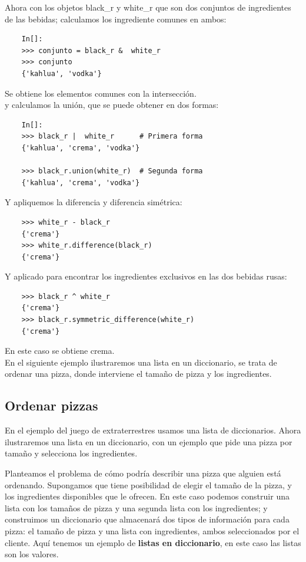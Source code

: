 Ahora con los objetos   {\ttfamily  black\_r}  y  {\ttfamily white\_r} que son dos conjuntos de ingredientes de las bebidas; calculamos los ingrediente comunes en ambos: 

\begin{lstlisting}
	In[]:
	>>> conjunto = black_r &  white_r
	>>> conjunto
	{'kahlua', 'vodka'}
\end{lstlisting}
Se obtiene los elementos comunes con la intersección.\\


y calculamos la unión, que se puede obtener en dos formas: 

\begin{lstlisting}
	In[]:
	>>> black_r |  white_r      # Primera forma
	{'kahlua', 'crema', 'vodka'}
	
	>>> black_r.union(white_r)  # Segunda forma
	{'kahlua', 'crema', 'vodka'}
\end{lstlisting}


Y apliquemos la diferencia y diferencia simétrica:

\begin{lstlisting}
	>>> white_r - black_r
	{'crema'}
	>>> white_r.difference(black_r)
	{'crema'}
\end{lstlisting}


Y  aplicado para encontrar los ingredientes exclusivos en las dos bebidas rusas:
\begin{lstlisting}
	>>> black_r ^ white_r
	{'crema'}
	>>> black_r.symmetric_difference(white_r)
	{'crema'}	
\end{lstlisting}

En este caso se obtiene crema.\\



En el siguiente ejemplo ilustraremos una lista en un diccionario, se trata de ordenar una pizza,  donde interviene el tamaño de pizza y los ingredientes. 


\subsection{Ordenar pizzas}

En el ejemplo del juego de extraterrestres usamos una lista de diccionarios. Ahora ilustraremos una lista en un diccionario, con un ejemplo que pide una pizza por tamaño y selecciona los ingredientes.  

Planteamos el problema  de cómo podría describir una pizza que alguien está ordenando. Supongamos que tiene posibilidad de elegir el tamaño de la pizza, y los ingredientes disponibles que le ofrecen.  En este caso podemos construir una lista con los tamaños de pizza y una segunda lista con los ingredientes; y construimos un  diccionario que almacenará dos tipos de información para cada pizza: el tamaño de pizza y una lista con ingredientes, ambos seleccionados por el cliente. Aquí tenemos un ejemplo de {\bf listas en diccionario}, en este caso las listas son los valores.


